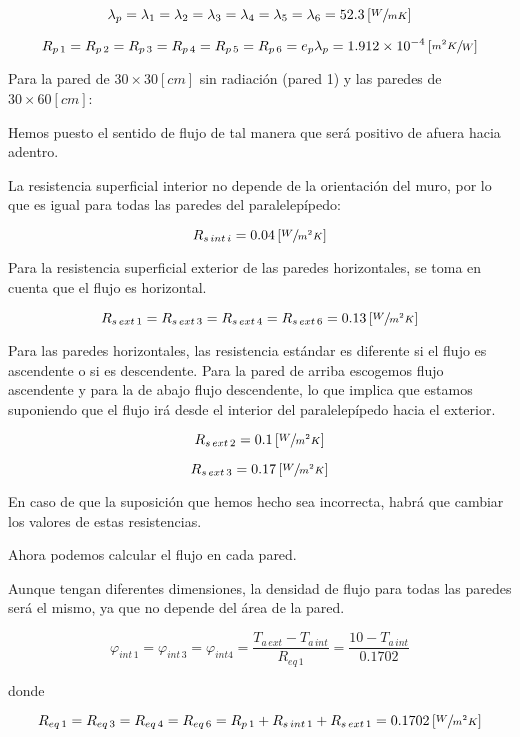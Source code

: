 \documentclass[11pt]{article}
\begin{document}
\[ \lambda _p = \lambda _1 = \lambda _2 = \lambda _3 = \lambda _4 = \lambda _5 = \lambda _6 = 52.3 \left[ \sfrac{ W }{ m K } \right] \]

\[ R_{ p \, 1 } = R_{ p \, 2 } = R_{ p \, 3 } = R_{ p \, 4 } = R_{ p \, 5 } = R_{ p \, 6 } = e_p \lambda _p = 1.912 \times 10 ^{ -4 } \left[ \sfrac{ m ^2 K }{ W } \right] \]

Para la pared de $ 30 \times 30 \left[ cm \right] $ sin radiación (pared 1) y las paredes de $ 30 \times 60 \left[ cm \right] $: 

Hemos puesto el sentido de flujo de tal manera que será positivo de afuera hacia adentro.

La resistencia superficial interior no depende de la orientación del muro, por lo que es igual para todas las paredes del paralelepípedo:

\[ R_{ s \, int \, i } = 0.04 \left[ \sfrac{ W }{ m ^2 K } \right] \]

Para la resistencia superficial exterior de las paredes horizontales, se toma en cuenta que el flujo es horizontal.

\[ R_{ s \, ext \, 1 } = R_{ s \, ext \, 3 } = R_{ s \, ext \, 4 } = R_{ s \, ext \, 6 } = 0.13 \left[ \sfrac{ W }{ m ^2 K } \right] \]

Para las paredes horizontales, las resistencia estándar es diferente si el flujo es ascendente o si es descendente. Para la pared de arriba escogemos flujo ascendente y para la de abajo flujo descendente, lo que implica que estamos suponiendo que el flujo irá desde el interior del paralelepípedo hacia el exterior.

\[ R_{ s \, ext \, 2 } = 0.1 \left[ \sfrac{ W }{ m^2 K } \right] \]

\[ R_{ s \, ext \, 3 } = 0.17 \left[ \sfrac{ W }{ m^2 K } \right] \]

En caso de que la suposición que hemos hecho sea incorrecta, habrá que cambiar los valores de estas resistencias.

Ahora podemos calcular el flujo en cada pared.

Aunque tengan diferentes dimensiones, la densidad de flujo para todas las paredes será el mismo, ya que no depende del área de la pared.

\[ \varphi _{ int \, 1 } = \varphi _{ int \, 3 } = \varphi _{ int 4 } = \frac{ T_{ a \, ext } - T_{ a \, int } }{ R_{ eq \, 1 } } = \frac{ 10 - T_{ a \, int } }{ 0.1702 } \]

donde

\[ R_{ eq \, 1 } = R_{ eq \, 3 } = R_{ eq \, 4 } = R_{ eq \, 6 } = R_{ p \, 1 } + R_{ s \, int \, 1 } + R_{ s \, ext \, 1 } = 0.1702 \left[ \sfrac{ W }{ m ^2 K } \right] \]
\end{document}
